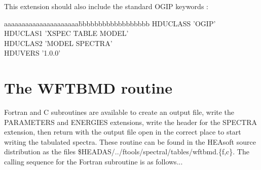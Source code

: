 \documentclass[11pt]{article}
\begin{document}
This extension should also include the standard OGIP keywords :

\begin{tabbing}
aaaaaaaaaaaaaaaaaaaaa\=bbbbbbbbbbbbbbbbbb\kill
HDUCLASS             \> 'OGIP'           \\
HDUCLAS1             \> 'XSPEC TABLE MODEL'    \\
HDUCLAS2             \> 'MODEL SPECTRA'    \\
HDUVERS              \> '1.0.0'          \\
\end{tabbing}

\section{The WFTBMD routine}

Fortran and C subroutines are available to create an output file, write 
the PARAMETERS and ENERGIES extensions, write the header for the 
SPECTRA extension, then return with the output file open in the 
correct place to start writing the tabulated spectra. These routine
can be found in the HEAsoft source distribution as the files 
\$HEADAS/../ftools/spectral/tables/wftbmd.\{f,c\}. The calling sequence for the
Fortran subroutine is as follows...
\end{document}
